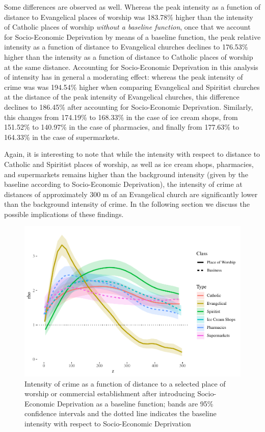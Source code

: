 \documentclass[smallextended]{svjour3}       %
\begin{document}
Some differences are observed as well. Whereas the peak intensity as a
function of distance to Evangelical places of worship was 183.78\%
higher than the intensity of Catholic places of worship \emph{without a
baseline function}, once that we account for Socio-Economic Deprivation
by means of a baseline function, the peak relative intensity as a
function of distance to Evangelical churches declines to 176.53\% higher
than the intensity as a function of distance to Catholic places of
worship at the same distance. Accounting for Socio-Economic Deprivation
in this analysis of intensity has in general a moderating effect:
whereas the peak intensity of crime was was 194.54\% higher when
comparing Evangelical and Spiritist churches at the distance of the peak
intensity of Evangelical churches, this difference declines to 186.45\%
after accounting for Socio-Economic Deprivation. Similarly, this changes
from 174.19\% to 168.33\% in the case of ice cream shops, from 151.52\%
to 140.97\% in the case of pharmacies, and finally from 177.63\% to
164.33\% in the case of supermarkets.

Again, it is interesting to note that while the intensity with respect
to distance to Catholic and Spiritist places of worship, as well as ice
cream shops, pharmacies, and supermarkets remains higher than the
background intensity (given by the baseline according to Socio-Economic
Deprivation), the intensity of crime at distances of approximately 300 m
of an Evangelical church are significantly lower than the background
intensity of crime. In the following section we discuss the possible
implications of these findings.

\begin{figure}
\centering
\includegraphics{Moral_Communities_and_Crime_v1_files/figure-latex/figure-plot-relative-distribution-with-baseline-1.pdf}
\caption{\label{fig:plot-relative-distribution-with-baseline}Intensity
of crime as a function of distance to a selected place of worship or
commercial establishment after introducing Socio-Economic Deprivation as
a baseline function; bands are 95\% confidence intervals and the dotted
line indicates the baseline intensity with respect to Socio-Economic
Deprivation}
\end{figure}
\end{document}
